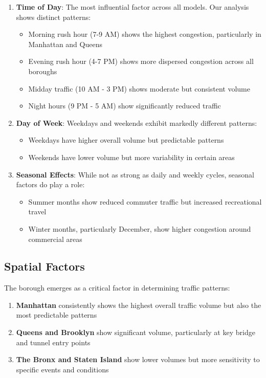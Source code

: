 \documentclass[
  letterpaper,
  DIV=11,
  numbers=noendperiod]{scrreprt}
\providecommand{\tightlist}{%
  \setlength{\itemsep}{0pt}\setlength{\parskip}{0pt}}\usepackage{longtable,booktabs,array}
\begin{document}
\begin{enumerate}
\def\labelenumi{\arabic{enumi}.}
\tightlist
\item
  \textbf{Time of Day}: The most influential factor across all models.
  Our analysis shows distinct patterns:

  \begin{itemize}
  \tightlist
  \item
    Morning rush hour (7-9 AM) shows the highest congestion,
    particularly in Manhattan and Queens
  \item
    Evening rush hour (4-7 PM) shows more dispersed congestion across
    all boroughs
  \item
    Midday traffic (10 AM - 3 PM) shows moderate but consistent volume
  \item
    Night hours (9 PM - 5 AM) show significantly reduced traffic
  \end{itemize}
\item
  \textbf{Day of Week}: Weekdays and weekends exhibit markedly different
  patterns:

  \begin{itemize}
  \tightlist
  \item
    Weekdays have higher overall volume but predictable patterns
  \item
    Weekends have lower volume but more variability in certain areas
  \end{itemize}
\item
  \textbf{Seasonal Effects}: While not as strong as daily and weekly
  cycles, seasonal factors do play a role:

  \begin{itemize}
  \tightlist
  \item
    Summer months show reduced commuter traffic but increased
    recreational travel
  \item
    Winter months, particularly December, show higher congestion around
    commercial areas
  \end{itemize}
\end{enumerate}

\subsection{Spatial Factors}\label{spatial-factors}

The borough emerges as a critical factor in determining traffic
patterns:

\begin{enumerate}
\def\labelenumi{\arabic{enumi}.}
\tightlist
\item
  \textbf{Manhattan} consistently shows the highest overall traffic
  volume but also the most predictable patterns
\item
  \textbf{Queens and Brooklyn} show significant volume, particularly at
  key bridge and tunnel entry points
\item
  \textbf{The Bronx and Staten Island} show lower volumes but more
  sensitivity to specific events and conditions
\end{enumerate}
\end{document}
